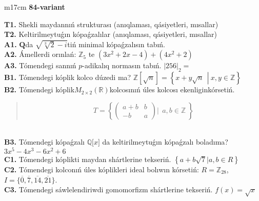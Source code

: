 \documentclass{article}
\begin{document}
\begin{tabular}{m{17cm}}
\textbf{84-variant}
\newline

\textbf{T1.} Shekli maydannıń strukturası (anıqlaması, qásiyetleri, mısallar) \\
\textbf{T2.} Keltirilmeytuǵın kópaǵzalılar (anıqlaması, qásiyetleri, mısallar) \\
\textbf{A1.} \(\mathbf{Q}\)da \(\sqrt{\sqrt[3]{2} - i}\)tiń minimal kópaǵzalısın tabıń. \\
\textbf{A2.} Ámellerdi orınlań: \(\mathbb{Z}_{5}\) te \(\left( 3x^{2} + 2x - 4 \right) + \left( 4x^{2} + 2 \right)\) \\
\textbf{A3.} Tómendegi sannıń \(p\)-adikalıq normasın tabıń. \(|256|_{2} =\) \\
\textbf{B1.} Tómendegi kóplik kolco dúzedi ma? \(\mathbb{Z}\left\lbrack \sqrt{n} \right\rbrack = \left\{ x + y\sqrt{n}\ \ \left| \right.\ x,y \in \mathbb{Z} \right\}\) \\
\textbf{B2.} Tómendegi kóplik\(M_{2 \times 2}\left( \mathbb{R} \right)\)kolcosınıń úles kolcosı ekenliginkórsetiń.
\begin{quote}
\[T = \left\{ \begin{pmatrix}
a + b & b \\
 - b & a
\end{pmatrix}\left| \ \ a,b\mathbb{\in Z} \right.\  \right\}\]
\end{quote} \\
\textbf{B3.} Tómendegi kópaǵzalı \(\mathbb{Q\lbrack}x\rbrack\) da keltirilmeytuǵın kópaǵzalı boladıma? \(3x^{5} - 4x^{3} - 6x^{2} + 6\) \\
\textbf{C1.} Tómendegi kóplikti maydan shártlerine tekseriń. \(\left\{ a + b\sqrt{7}|a,b \in R \right\}\) \\
\textbf{C2.} Tómendegi kolconıń úles kóplikleri ideal bolıwın kórsetiń:
\(R = \mathbb{Z}_{28}\), \(I = \{\overline{0},\overline{7},\overline{14},\overline{21}\}\). \\
\textbf{C3.} Tómendegi sáwlelendiriwdi gomomorfizm shártlerine tekseriń. \(f(x) = \sqrt{x}\) \\

\end{tabular}
\vspace{1cm}
\end{document}
